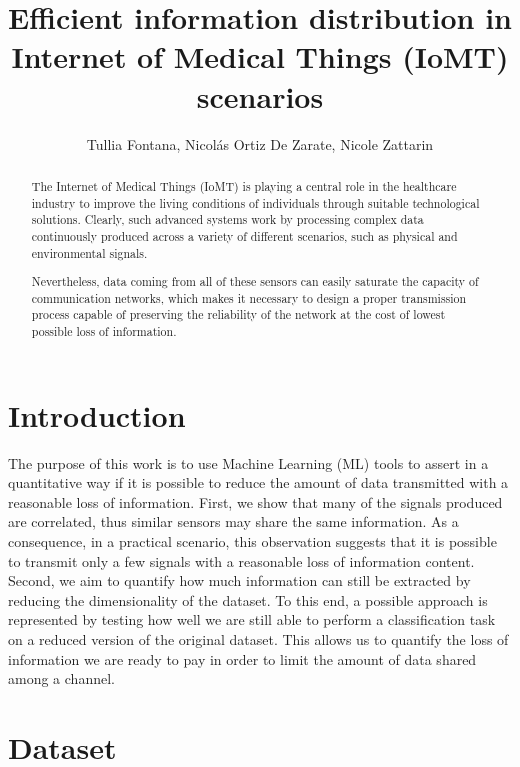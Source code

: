 \documentclass[10pt, a4paper, twocolumn]{article}
\title{Efficient information distribution in Internet of Medical Things (IoMT) scenarios} %
\author{Tullia Fontana, Nicolás Ortiz De Zarate, Nicole Zattarin}
\date{}
\theoremstyle{definition}
\begin{document}
\maketitle

\begin{abstract}
The Internet of Medical Things (IoMT) is playing a central role in the healthcare industry to improve the living conditions of individuals through suitable technological solutions. Clearly, such advanced systems work by processing complex data continuously produced across a variety of different scenarios, such as physical and environmental signals. \par 
Nevertheless, data coming from all of these sensors can easily saturate the capacity of communication networks, which makes it necessary to design a proper transmission process capable of preserving the reliability of the network at the cost of lowest possible loss of information.
\end{abstract}

\section{Introduction}
The purpose of this work is to use Machine Learning (ML) tools to assert in a quantitative way if it is possible to reduce the amount of data transmitted with a reasonable loss of information. First, we show that many of the signals produced are correlated, thus similar sensors may share the same information. As a consequence, in a practical scenario, this observation suggests that it is possible to transmit only a few signals with a reasonable loss of information content. Second, we aim to quantify how much information can still be extracted by reducing the dimensionality of the dataset. To this end, a possible approach is represented by testing how well we are still able to perform a classification task on a reduced version of the original dataset. This allows us to quantify the loss of information we are ready to pay in order to limit the amount of data shared among a channel.

\section{Dataset}
\end{document}
